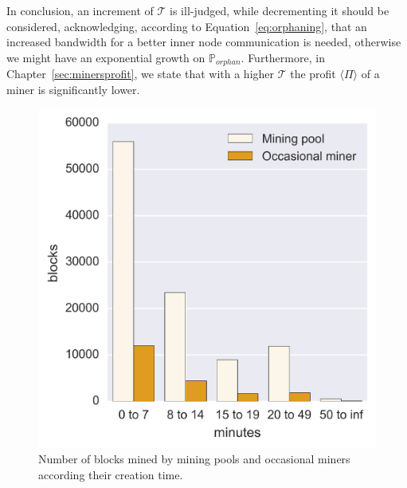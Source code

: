 \documentclass[USenglish]{uit-thesis}
\begin{document}
In conclusion, an increment of $\mathcal{T}$ is ill-judged, while
decrementing it should be considered, acknowledging, according to
Equation~\ref{eq:orphaning}, that an increased bandwidth
for a better inner node communication is needed, otherwise we
might have an exponential growth on $\mathbb{P}_{orphan}$.
Furthermore, in Chapter~\ref{sec:minersprofit}, we state that
with a higher $\mathcal{T}$ the profit $\langle \Pi \rangle$ of
a miner is significantly lower.
\begin{figure}[h]
	\centering
	\includegraphics[width=1\textwidth]{img/creation_time_miners}
	\caption{Number of blocks mined by mining pools and occasional miners according their creation time.}
	\label{fig:creation_time_miners}
\end{figure}
\end{document}
